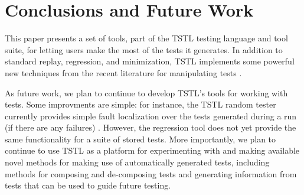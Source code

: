 \section{Conclusions and Future Work}

This paper presents a set of tools, part of the TSTL \cite{tstlsttt}
testing language and tool suite, for letting users make the most of the
tests it generates.  In addition to standard
replay, regression, and minimization, TSTL implements some powerful
new techniques from the recent literature for manipulating tests
\cite{OneTest,slippage}.

As future work, we plan to continue to develop TSTL's tools for
working with tests.  Some improvments are simple:  for instance, the TSTL
random tester currently provides simple fault localization over the
tests generated during a run (if there are any failures)
\cite{Tarantula}.  However, the regression tool does not yet provide
the same functionality for a suite of stored tests.  More importantly,
we plan to continue to use TSTL as a platform for experimenting with
and making available novel methods for making use of automatically
generated tests, including methods for composing and de-composing
tests and generating information from tests that can be used to guide
future testing.